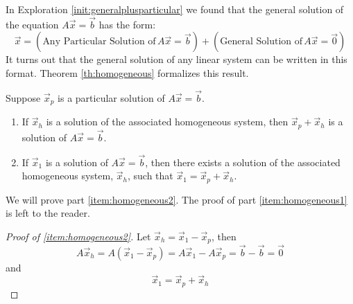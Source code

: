 \documentclass{ximera}
\begin{document}
In Exploration \ref{init:generalplusparticular} we found that the general solution of the equation $A\vec{x}=\vec{b}$ has the form:
 $$\vec{x}=(\text{Any Particular Solution of}\,A\vec{x}=\vec{b}) + (\text{General Solution of}\,A\vec{x}=\vec{0})$$
It turns out that the general solution of any linear system can be written in this format.  Theorem \ref{th:homogeneous} formalizes this result.

\begin{theorem}\label{th:homogeneous}Suppose $\vec{x}_p$ is a particular solution of $A\vec{x}=\vec{b}$.
  \begin{enumerate}
  \item\label{item:homogeneous1} If $\vec{x}_h$ is a solution of the associated homogeneous system, then $\vec{x}_p+\vec{x}_h$ is a solution of $A\vec{x}=\vec{b}$. 
  \item \label{item:homogeneous2}If $\vec{x}_1$ is a solution of $A\vec{x}=\vec{b}$, then there exists a solution of the associated homogeneous system, $\vec{x}_h$, such that  $\vec{x}_1=\vec{x}_p+\vec{x}_h$.
  \end{enumerate}
\end{theorem}
We will prove part \ref{item:homogeneous2}.  The proof of part \ref{item:homogeneous1} is left to the reader.
\begin{proof}[Proof of \ref{item:homogeneous2}]
Let $\vec{x}_h=\vec{x}_1-\vec{x}_p$, then 
$$A\vec{x}_h=A(\vec{x}_1-\vec{x}_p)=A\vec{x}_1-A\vec{x}_p=\vec{b}-\vec{b}=\vec{0}$$
and
$$\vec{x}_1=\vec{x}_p+\vec{x}_h$$
\end{proof}
\end{document}
